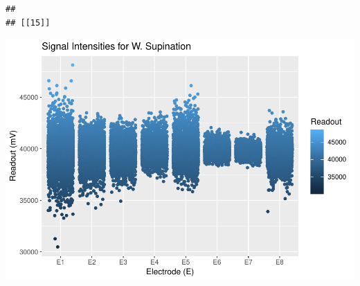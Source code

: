 \documentclass[]{article}
\begin{document}
\begin{verbatim}
## 
## [[15]]
\end{verbatim}

\includegraphics{Megahand_files/figure-latex/unnamed-chunk-6-15.pdf}
\end{document}
